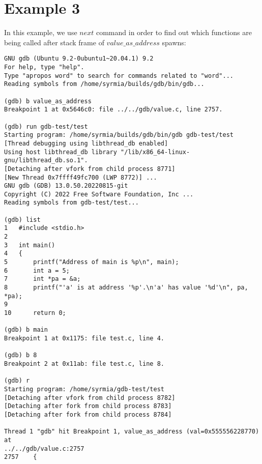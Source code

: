 \documentclass{report}
\begin{document}
\section *{Example 3}
In this example, we use $next$ command in order to find out which functions are being called after stack frame of $value\_as\_address$ spawns:
\begin{verbatim}
GNU gdb (Ubuntu 9.2-0ubuntu1~20.04.1) 9.2
For help, type "help".
Type "apropos word" to search for commands related to "word"...
Reading symbols from /home/syrmia/builds/gdb/bin/gdb...

(gdb) b value_as_address
Breakpoint 1 at 0x5646c0: file ../../gdb/value.c, line 2757.

(gdb) run gdb-test/test
Starting program: /home/syrmia/builds/gdb/bin/gdb gdb-test/test
[Thread debugging using libthread_db enabled]
Using host libthread_db library "/lib/x86_64-linux-gnu/libthread_db.so.1".
[Detaching after vfork from child process 8771]
[New Thread 0x7ffff49fc700 (LWP 8772)] ...
GNU gdb (GDB) 13.0.50.20220815-git
Copyright (C) 2022 Free Software Foundation, Inc ...
Reading symbols from gdb-test/test...

(gdb) list
1	#include <stdio.h>
2	
3	int main()
4	{
5		printf("Address of main is %p\n", main);
6		int a = 5;
7		int *pa = &a;
8		printf("'a' is at address '%p'.\n'a' has value '%d'\n", pa, *pa);
9	
10		return 0;

(gdb) b main
Breakpoint 1 at 0x1175: file test.c, line 4.

(gdb) b 8
Breakpoint 2 at 0x11ab: file test.c, line 8.

(gdb) r
Starting program: /home/syrmia/gdb-test/test 
[Detaching after vfork from child process 8782]
[Detaching after fork from child process 8783]
[Detaching after fork from child process 8784]

Thread 1 "gdb" hit Breakpoint 1, value_as_address (val=0x555556228770) at 
../../gdb/value.c:2757
2757	{


\end{verbatim}
\end{document}
